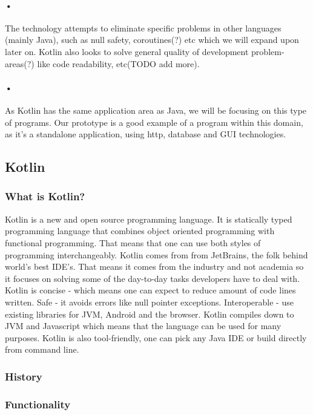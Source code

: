 \paragraph{•}
The technology attempts to eliminate specific problems in other languages (mainly Java), such as null safety, coroutines(?) etc which we will expand upon later on. Kotlin also looks to solve general quality of development problem-areas(?) like code readability, etc(TODO add more).

\paragraph{•}
As Kotlin has the same application area as Java, we will be focusing on this type of programs. Our prototype is a good example of a program within this domain, as it's a standalone application, using http, database and GUI technologies.

\subsection{Kotlin}

\subsubsection{What is Kotlin?}
Kotlin is a new and open source programming language. It is statically typed programming language that combines object oriented programming with functional programming. That means that one can use both styles of programming interchangeably. Kotlin comes from from JetBrains, the folk behind world's best IDE's. That means it comes from the industry and not academia so it focuses on solving some of the day-to-day tasks developers have to deal with. Kotlin is concise - which means one can expect to reduce amount of code lines written. Safe - it avoids errors like null pointer exceptions. Interoperable - use existing libraries for JVM, Android and the browser. Kotlin compiles down to JVM and Javascript which means that the language can be used for many purposes. Kotlin is also tool-friendly, one can pick any Java IDE or build directly from command line.
\subsubsection{History}
\subsubsection{Functionality} 
